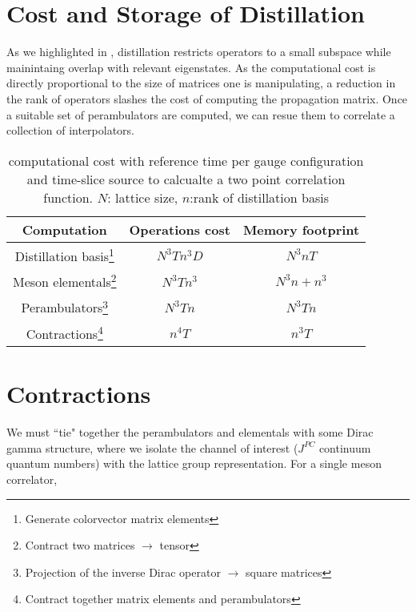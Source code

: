 \section{Cost and Storage of Distillation}
      As we highlighted in , distillation restricts operators to a small subspace while mainintaing overlap with relevant eigenstates. As the computational cost is directly proportional to the size of matrices one is manipulating, a reduction in the rank of operators slashes the cost of computing the propagation matrix. Once a suitable set of perambulators are computed, we can resue them to correlate a collection of interpolators.

      \vspace{1em}
       
        \begin{table}
        \begin{minipage}{16cm}
        \hspace*{2em}\begin{tabular}{ccc}
        Computation    & Operations cost & Memory footprint \\ \hline
        Distillation basis\footnote{Generate colorvector matrix elements}& $N^3Tn^3D$         & $N^3nT$      \\
        Meson elementals\footnote{Contract two matrices $\to$ tensor} & $N^3Tn^3$      & $N^3n + n^3$  \\
        Perambulators\footnote{Projection of the inverse Dirac operator $\to$ square matrices} & $N^3Tn$   & $N^3Tn$            \\
        Contractions\footnote{Contract together matrix elements and perambulators}   & $n^4T$    & $n^{3}T$   
        \end{tabular}
        \end{minipage}
        \caption{computational cost with reference time per gauge configuration and time-slice source to calcualte a two point correlation function. $N$: lattice size, $n$:rank of distillation basis}
      \end{table}

  \section{Contractions}
  We must ``tie" together the perambulators and elementals with some Dirac gamma structure, where we isolate the channel of interest ($J^{PC}$ continuum quantum numbers) with the lattice group representation. For a single meson correlator, \\ 

